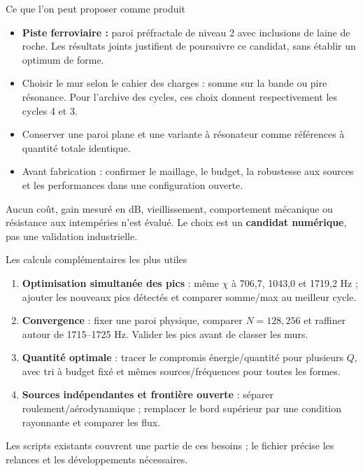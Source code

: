 \begin{frame}{Ce que l'on peut proposer comme produit}
\begin{itemize}
\item \textbf{Piste ferroviaire :} paroi préfractale de niveau 2 avec inclusions de laine de roche. Les résultats joints justifient de poursuivre ce candidat, sans établir un optimum de forme.
\item Choisir le mur selon le cahier des charges : somme sur la bande ou pire résonance. Pour l'archive des cycles, ces choix donnent respectivement les cycles 4 et 3.
\item Conserver une paroi plane et une variante à résonateur comme références à quantité totale identique.
\item Avant fabrication : confirmer le maillage, le budget, la robustesse aux sources et les performances dans une configuration ouverte.
\end{itemize}
\medskip
\small Aucun coût, gain mesuré en dB, vieillissement, comportement mécanique ou résistance aux intempéries n'est évalué. Le choix est un \textbf{candidat numérique}, pas une validation industrielle.
\end{frame}

\begin{frame}{Les calculs complémentaires les plus utiles}
\small
\begin{enumerate}
\item \textbf{Optimisation simultanée des pics} : même $\chi$ à 706,7, 1043,0 et 1719,2 Hz ; ajouter les nouveaux pics détectés et comparer somme/max au meilleur cycle.
\item \textbf{Convergence} : fixer une paroi physique, comparer $N=128,256$ et raffiner autour de 1715--1725 Hz. Valider les pics avant de classer les murs.
\item \textbf{Quantité optimale} : tracer le compromis énergie/quantité pour plusieurs $Q$, avec tri à budget fixé et mêmes sources/fréquences pour toutes les formes.
\item \textbf{Sources indépendantes et frontière ouverte} : séparer roulement/aérodynamique ; remplacer le bord supérieur par une condition rayonnante et comparer les flux.
\end{enumerate}
\medskip
Les scripts existants couvrent une partie de ces besoins ; le fichier
 précise les relances et les développements nécessaires.
\end{frame}

